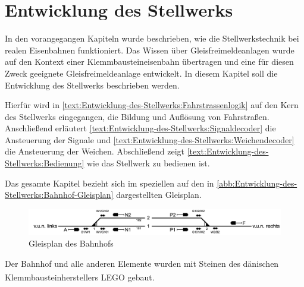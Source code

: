 \chapter{Entwicklung des Stellwerks}\label{text:Entwicklung-des-Stellwerks}

In den vorangegangen Kapiteln wurde beschrieben, wie die Stellwerkstechnik bei realen Eisenbahnen funktioniert. Das Wissen über Gleisfreimeldeanlagen wurde auf den Kontext einer Klemmbausteineisenbahn übertragen und eine für diesen Zweck geeignete Gleisfreimeldeanlage entwickelt. In diesem Kapitel soll die Entwicklung des Stellwerks beschrieben werden.

Hierfür wird in \autoref{text:Entwicklung-des-Stellwerks:Fahrstrassenlogik}  auf den Kern des Stellwerks eingegangen, die Bildung und Auflösung von Fahrstraßen. Anschließend erläutert \autoref{text:Entwicklung-des-Stellwerks:Signaldecoder}  die Ansteuerung der Signale und \autoref{text:Entwicklung-des-Stellwerks:Weichendecoder}  die Ansteuerung der Weichen. Abschließend zeigt \autoref{text:Entwicklung-des-Stellwerks:Bedienung}  wie das Stellwerk zu bedienen ist.

Das gesamte Kapitel bezieht sich im speziellen auf den in \autoref{abb:Entwicklung-des-Stellwerks:Bahnhof-Gleisplan} dargestellten Gleisplan.

\begin{figure}[H]
    \centering
    \includegraphics[width=\textwidth]{Assets/Images/5-Entwicklung-des-Stellwerks/Bahnhof-Gleisplan.png}
    \caption{Gleisplan des Bahnhofs}\label{abb:Entwicklung-des-Stellwerks:Bahnhof-Gleisplan}
\end{figure}

Der Bahnhof und alle anderen Elemente wurden mit Steinen des dänischen Klemmbausteinherstellers LEGO\textsuperscript{\tiny{\textregistered}} gebaut.

\newpage


\newpage


\newpage


\newpage

